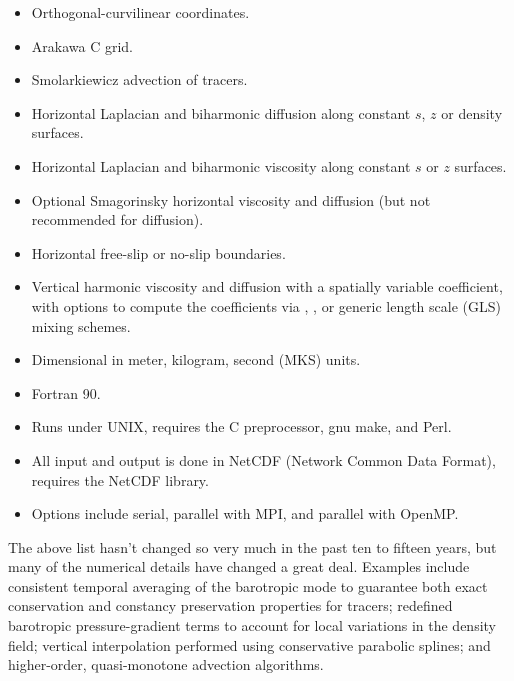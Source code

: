 \begin{klist}
\begin{itemize}
  \item Orthogonal-curvilinear coordinates.
  \item Arakawa C grid.
  \item Smolarkiewicz advection of tracers.
\end{itemize}
 \mbox{}
\begin{itemize}
  \item Horizontal Laplacian and biharmonic
    diffusion along constant $s$, $z$ or density
    surfaces.
  \item Horizontal Laplacian and biharmonic viscosity
    along constant $s$ or $z$ surfaces.
  \item Optional Smagorinsky horizontal viscosity and diffusion (but
  not recommended for diffusion).
  \item Horizontal free-slip or no-slip boundaries.
  \item Vertical harmonic viscosity and diffusion with a spatially
    variable coefficient, with options to compute the coefficients
    via \cite{Large94}, \cite{Mellor74},
    or generic length scale (GLS) \cite{Umlauf2003} mixing schemes.
\end{itemize}
\newpage
{} \mbox{}
\begin{itemize}
  \item Dimensional in meter, kilogram, second (MKS) units.
  \item Fortran 90.
  \item Runs under UNIX, requires the C preprocessor, gnu make, and
  Perl.
  \item All input and output is done in NetCDF \cite{netCDF} (Network
    Common Data Format), requires the NetCDF library.
  \item Options include serial, parallel with MPI, and parallel with
  OpenMP.
\end{itemize}
\end{klist}
The above list hasn't changed so very much in the past ten to fifteen
years, but many of the numerical details have changed a great deal.
Examples include consistent temporal averaging of the barotropic
mode to guarantee both exact conservation and constancy preservation
properties for tracers; redefined barotropic pressure-gradient terms
to account for local variations in the density field; vertical
interpolation performed using conservative parabolic splines; and
higher-order, quasi-monotone advection algorithms.


